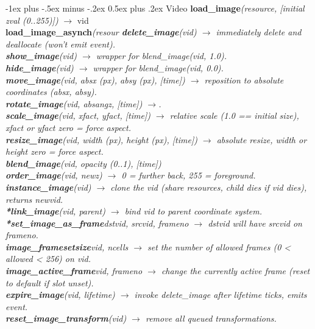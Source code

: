 \documentclass[10pt,landscape]{article}
\makeatletter
\renewcommand{\section}{\@startsection{section}{1}{0mm}%
                                {-1ex plus -.5ex minus -.2ex}%
                                {0.5ex plus .2ex}%
                                {\normalfont\large\bfseries}}
\makeatother
\begin{document}
\begin{multicols}{3}
\section{Video}
	\textbf{load\_image}\emph{(resource, [initial zval (0..255)])} $\rightarrow$ vid\\
	\textbf{load\_image\_asynch}\emph{(resour
	\textbf{delete\_image}\emph{(vid)} $\rightarrow$ immediately delete and deallocate (won't emit event).\\
	\textbf{show\_image}\emph{(vid)} $\rightarrow$ wrapper for blend\_image(vid, 1.0).\\
	\textbf{hide\_image}\emph{(vid)} $\rightarrow$ wrapper for blend\_image(vid, 0.0).\\
	\textbf{move\_image}\emph{(vid, absx (px), absy (px), [time])} $\rightarrow$ reposition to absolute coordinates (absx, absy).\\
	\textbf{rotate\_image}\emph{(vid, absangz, [time])} $\rightarrow$.\\
	\textbf{scale\_image}\emph{(vid, xfact, yfact, [time])} $\rightarrow$ relative scale (1.0 == initial size), xfact or yfact zero = force aspect.\\
	\textbf{resize\_image}\emph{(vid, width (px), height (px), [time])} $\rightarrow$ absolute resize, width or height zero = force aspect.\\
	\textbf{blend\_image}\emph{(vid, opacity (0..1), [time])}\\
	\textbf{order\_image}\emph{(vid, newz)} $\rightarrow$ 0 = further back, 255 = foreground.\\
	\textbf{instance\_image}\emph{(vid)} $\rightarrow$ clone the vid (share resources, child dies if vid dies), returns newvid.\\
	\textbf{*link\_image}\emph{(vid, parent)} $\rightarrow$ bind vid to parent coordinate system.\\
	\textbf{*set\_image\_as\_frame}\emph{dstvid, srcvid, frameno} $\rightarrow$ dstvid will have srcvid on frameno.\\
	\textbf{image\_framesetsize}\emph{vid, ncells} $\rightarrow$ set the number of allowed frames (0 < allowed < 256) on vid.\\
	\textbf{image\_active\_frame}\emph{vid, frameno} $\rightarrow$ change the currently active frame (reset to default if slot unset).\\
	\textbf{expire\_image}\emph{(vid, lifetime)} $\rightarrow$ invoke delete\_image after lifetime ticks, emits event.\\
	\textbf{reset\_image\_transform}\emph{(vid)} $\rightarrow$ remove all queued transformations.\\
}
\end{multicols}
\end{document}
